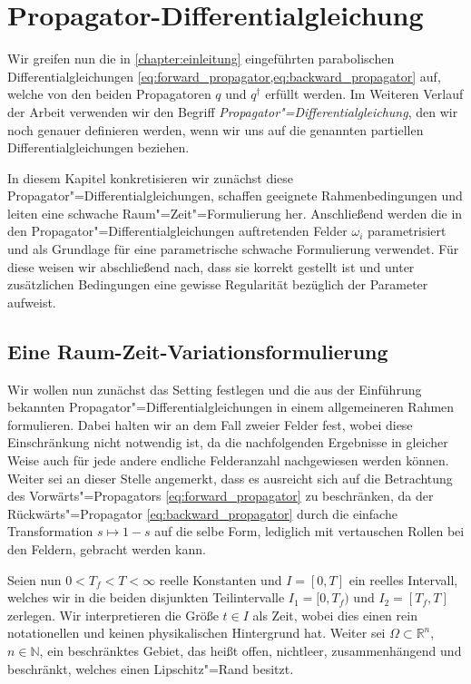 
\chapter{Propagator-Differentialgleichung} %
\label{chapter:propagator_differentialgleichung}

Wir greifen nun die in \cref{chapter:einleitung} eingeführten parabolischen Differentialgleichungen \cref{eq:forward_propagator,eq:backward_propagator} auf, welche von den beiden Propagatoren $q$ und $q^{\dagger}$ erfüllt werden.
Im Weiteren Verlauf der Arbeit verwenden wir den Begriff \emph{Propagator"=Differentialgleichung}, den wir noch genauer definieren werden, wenn wir uns
auf die genannten partiellen Differentialgleichungen beziehen.

In diesem Kapitel konkretisieren wir zunächst diese Propagator"=Differentialgleichungen, schaffen geeignete Rahmenbedingungen und leiten eine schwache Raum"=Zeit"=Formulierung her.
Anschließend werden die in den Propagator"=Differentialgleichungen auftretenden Felder $\omega_{i}$ parametrisiert und als Grundlage für eine parametrische schwache Formulierung verwendet.
Für diese weisen wir abschließend nach, dass sie korrekt gestellt ist und unter zusätzlichen Bedingungen eine gewisse Regularität bezüglich der Parameter aufweist.


\section{Eine Raum-Zeit-Variationsformulierung}
\label{section:raum_zeit_variationsformulierung}

Wir wollen nun zunächst das Setting festlegen und die aus der Einführung bekannten Propagator"=Differentialgleichungen in einem allgemeineren Rahmen formulieren.
Dabei halten wir an dem Fall zweier Felder fest, wobei diese Einschränkung nicht notwendig ist, da die nachfolgenden Ergebnisse in gleicher Weise auch für jede andere endliche Felderanzahl nachgewiesen werden können.
Weiter sei an dieser Stelle angemerkt, dass es ausreicht sich auf die Betrachtung des Vorwärts"=Propagators \cref{eq:forward_propagator} zu beschränken, da der Rückwärts"=Propagator \cref{eq:backward_propagator} durch die einfache Transformation $s \mapsto 1 - s$ auf die selbe Form, lediglich mit vertauschen Rollen bei den Feldern, gebracht werden kann.

Seien nun $0 < T_{f} < T < \infty$ reelle Konstanten und $I = [0, T]$ ein reelles Intervall, welches wir in die beiden disjunkten Teilintervalle $I_{1} = [0, T_{f})$ und $I_{2} = [T_{f}, T]$ zerlegen.
Wir interpretieren die Größe $t \in I$ als Zeit, wobei dies einen rein notationellen und keinen physikalischen Hintergrund hat.
Weiter sei $\Omega \subset \mathbb{R}^{n}$, $n \in \mathbb{N}$, ein beschränktes Gebiet, das heißt offen, nichtleer, zusammenhängend und beschränkt, welches einen Lipschitz"=Rand besitzt.


